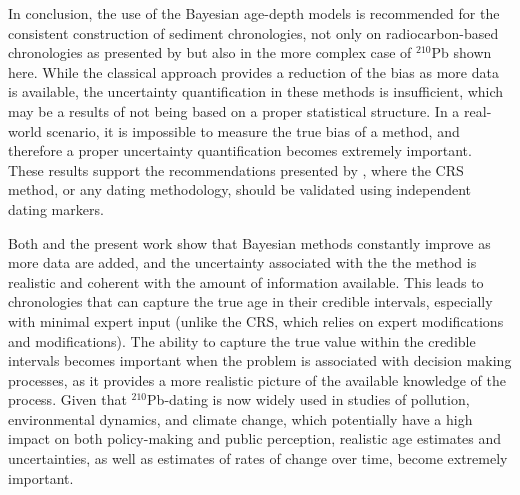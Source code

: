 \documentclass [10pt] {article}
\begin{document}

In conclusion, the use of the Bayesian age-depth models is recommended for the consistent construction of sediment chronologies, not only on radiocarbon-based chronologies as presented by \citet{Blaauw2018} but also in the more complex case of $^{210}$Pb shown here.
While the classical approach provides a reduction of the bias as more data is available, the uncertainty quantification in these methods is insufficient, which may be a results of not being based on a proper statistical structure. 
In a real-world scenario, it is impossible to measure the true bias of a method, and therefore a proper uncertainty quantification becomes extremely important.
These results support the recommendations presented by \citet{Smith2001,Barsanti2020}, where the CRS method, or any dating methodology, should be validated using independent dating markers. 

Both \citet{Blaauw2018} and the present work show that Bayesian methods constantly improve as more data are added, and the uncertainty associated with the the method is realistic and coherent with the amount of information available. 
This leads to chronologies that can capture the true age in their credible intervals, especially with minimal expert input (unlike the CRS, which relies on expert modifications and modifications). 
The ability to capture the true value within the credible intervals becomes important when the problem is associated with decision making processes, as it provides a more realistic picture of the available knowledge of the process. 
Given that $^{210}$Pb-dating is now widely used in studies of pollution, environmental dynamics, and climate change, which potentially have a high impact on both policy-making and public perception, realistic age estimates and uncertainties, as well as estimates of rates of change over time, become extremely important.
\end{document}
